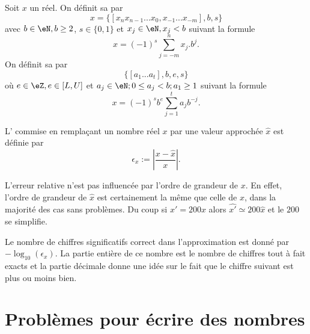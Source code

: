 \begin{definition}
	Soit $x$ un réel. On définit sa  par
	\begin{equation}
		x=\{[x_nx_{n-1}...x_0,x_{-1}...x_{-m}], b, s\}
	\end{equation}
	avec  $b\in\eN, b\geq2$, $s\in\{0,1\}$ et $x_j\in\eN,x_j<b$ suivant la formule
	\begin{equation}
		x=(-1)^{s}\sum_{j=-m}^nx_j.b^j.
	\end{equation}
	On définit sa  par
	\begin{equation}
		\{[a_1...a_t],b,e,s\}
	\end{equation}
	où $e\in\eZ,e\in[L,U]$ et $a_j\in\eN;0\leq a_j<b; a_1\geq1$ suivant la formule
	\begin{equation}        \label{EqRepreFlotNOrm}
		x=(-1)^sb^e\sum_{j=1}^ta_jb^{-j}.
	\end{equation}
\end{definition}

\begin{definition}
	L' commise en remplaçant un nombre réel $x$ par une valeur approchée $\hat{x}$ est définie par
	\begin{equation}
		\epsilon_x:=\left|\frac{x-\hat{x}}{x}\right|.
	\end{equation}
\end{definition}

L'erreur relative n'est pas influencée par l'ordre de grandeur de \( x\). En effet, l'ordre de grandeur de \( \hat x\) est certainement la même que celle de \( x\), dans la majorité des cas sans problèmes. Du coup si \( x'=200x\) alors \( \hat{x'}\simeq 200\hat{x}\) et le \( 200\) se simplifie.

Le nombre de chiffres significatifs correct dans l'approximation est donné par \( -\log_{10}(\epsilon_x)\). La partie entière de ce nombre est le nombre de chiffres tout à fait exacts et la partie décimale donne une idée sur le fait que le chiffre suivant est plus ou moins bien.

\section{Problèmes pour écrire des nombres}

